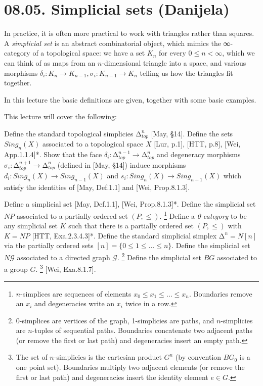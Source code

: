 \documentclass[a4paper]{amsart}
\numberwithin{figure}{section}
\theoremstyle{theorem}
\theoremstyle{definition}
\newcommand{\cG}{\mathcal{G}}
\begin{document}
\section{08.05. Simplicial sets (Danijela)}

In practice, it is often more practical to work with triangles rather than squares. A \emph{simplicial set} is an abstract combinatorial object, which mimics the ∞-category of a topological space: we have a set $K_n$ for every $0 \leq n < \infty$, which we can think of as maps from an $n$-dimensional triangle into a space, and various morphisms $\delta_i: K_n \to K_{n-1}, \sigma_i: K_{n-1} \to K_n$ telling us how the triangles fit together.

In this lecture the basic definitions are given, together with some basic examples.

This lecture will cover the following: 

Define the standard topological simplicies $∆^n_{top}$ [May, §14]. %
Define the sets $Sing_n(X)$ associated to a topological space $X$ [Lur, p.1], [HTT, p.8], [Wei, App.1.1.4]*. %
Show that the face $\delta_i: ∆^{n-1}_{top} → ∆^{n}_{top}$ and degeneracy morphisms $\sigma_i: ∆^{n+1}_{top} → ∆^{n}_{top}$ (defined in [May, §14]) induce morphisms $d_i: Sing_n(X) → Sing_{n-1}(X)$ and $s_i: Sing_n(X) → Sing_{n+1}(X)$ which satisfy the identities of  [May, Def.1.1] and [Wei, Prop.8.1.3]. %

Define a simplicial set [May, Def.1.1], [Wei, Prop.8.1.3]*. %
Define the simplicial set $NP$ associated to a partially ordered set $(P, ≤)$.%
\footnote{$n$-simplices are sequences of elements $x_0 \leq x_1 \leq \dots \leq x_n$. Boundaries remove an $x_i$ and degeneracies write an $x_i$ twice in a row.} %
Define a \emph{0-category} to be any simplicial set $K$ such that there is a partially ordered set $(P, ≤)$ with $K = NP$ [HTT, Exa.2.3.4.3]*. %
Define the standard simplicial simplex $∆^n = N[n]$ via the partially ordered sets $[n] = \{ 0 \leq 1 \leq \dots \leq n\}$. %
Define the simplicial set $N\cG$ associated to a directed graph $\cG$.%
\footnote{0-simplices are vertices of the graph, 1-simplicies are paths, and $n$-simplicies are $n$-tuples of sequential paths. Boundaries concatenate two adjacent paths (or remove the first or last path) and degeneracies insert an empty path.} %
Define the simplicial set $BG$ associated to a group $G$.%
\footnote{The set of $n$-simplicies is the cartesian product $G^n$ (by convention $BG_0$ is a one point set). Boundaries multiply two adjacent elements (or remove the first or last path) and degeneracies insert the identity element $e \in G$.} %
[Wei, Exa.8.1.7]. %
\end{document}
